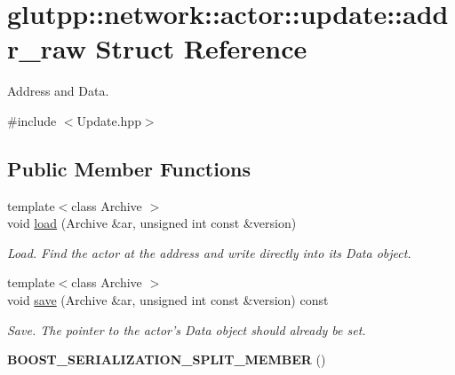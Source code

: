 \hypertarget{structglutpp_1_1network_1_1actor_1_1update_1_1addr__raw}{\section{glutpp\-:\-:network\-:\-:actor\-:\-:update\-:\-:addr\-\_\-raw \-Struct \-Reference}
\label{structglutpp_1_1network_1_1actor_1_1update_1_1addr__raw}
}


\-Address and \-Data.  




{\ttfamily \#include $<$\-Update.\-hpp$>$}

\subsection*{\-Public \-Member \-Functions}
\begin{DoxyCompactItemize}
\item 
{\footnotesize template$<$class Archive $>$ }\\void \hyperlink{structglutpp_1_1network_1_1actor_1_1update_1_1addr__raw_a4883db7c0b5227e0fcb124f786a121c1}{load} (\-Archive \&ar, unsigned int const \&version)
\begin{DoxyCompactList}\small\item\em \-Load. \-Find the actor at the address and write directly into its \-Data object. \end{DoxyCompactList}\item 
\hypertarget{structglutpp_1_1network_1_1actor_1_1update_1_1addr__raw_a52ecb325c7b91c90244d0d80a3f52ce0}{{\footnotesize template$<$class Archive $>$ }\\void \hyperlink{structglutpp_1_1network_1_1actor_1_1update_1_1addr__raw_a52ecb325c7b91c90244d0d80a3f52ce0}{save} (\-Archive \&ar, unsigned int const \&version) const }\label{structglutpp_1_1network_1_1actor_1_1update_1_1addr__raw_a52ecb325c7b91c90244d0d80a3f52ce0}

\begin{DoxyCompactList}\small\item\em \-Save. \-The pointer to the actor's \-Data object should already be set. \end{DoxyCompactList}\item 
\hypertarget{structglutpp_1_1network_1_1actor_1_1update_1_1addr__raw_acb8555614a3b629c3ce0523700b8ed39}{{\bfseries \-B\-O\-O\-S\-T\-\_\-\-S\-E\-R\-I\-A\-L\-I\-Z\-A\-T\-I\-O\-N\-\_\-\-S\-P\-L\-I\-T\-\_\-\-M\-E\-M\-B\-E\-R} ()}\label{structglutpp_1_1network_1_1actor_1_1update_1_1addr__raw_acb8555614a3b629c3ce0523700b8ed39}

\end{DoxyCompactItemize}
